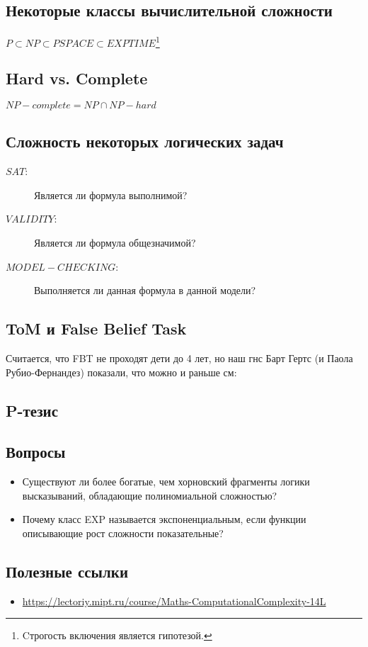 \subsection{Некоторые классы вычислительной сложности}

\begin{center}
$P \subset NP \subset PSPACE \subset EXPTIME$\footnote{
Cтрогость включения  является гипотезой.}	
\end{center}

\subsection{Hard vs. Complete}
$NP-complete =  NP \cap NP-hard$

\subsection{Сложность некоторых логических задач}

\begin{description}
\item[$SAT$:] Является ли формула выполнимой?
\item[$VALIDITY$:] Является ли формула общезначимой?
\item[$MODEL-CHECKING$:] Выполняется ли данная формула в данной модели?	
\end{description}


\subsection{ToM и False Belief Task}
Считается, что FBT не проходят дети  до 4 лет, но наш гнс Барт Гертс (и Паола Рубио-Фернандез) показали, что можно и раньше см: \autocite{Rubio-Fernandez2013a}
\subsection{P-тезис}

\subsection{Вопросы}
\begin{itemize}
    \item Существуют ли более богатые, чем хорновский фрагменты логики высказываний, обладающие полиномиальной сложностью?
    \item Почему класс EXP называется экспоненциальным, если функции описывающие рост сложности показательные?
\end{itemize}

\subsection{Полезные ссылки}
\begin{itemize}
    \item \url{https://lectoriy.mipt.ru/course/Maths-ComputationalComplexity-14L}
\end{itemize}